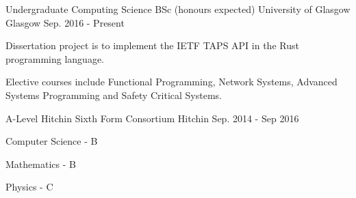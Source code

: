 

\begin{cventries}

  \cventry
    {Undergraduate Computing Science BSc (honours expected)} %
    {University of Glasgow} %
    {Glasgow} %
    {Sep. 2016 - Present} %
    {
      \begin{cvitems} %
        \item {Dissertation project is to implement the IETF TAPS API in the Rust programming language.}
	\item {Elective courses include Functional Programming, Network Systems, Advanced Systems Programming and Safety Critical Systems.}
      \end{cvitems}
    }
  \cventry
    {A-Level}
    {Hitchin Sixth Form Consortium}
    {Hitchin}
    {Sep. 2014 - Sep 2016}
    {
      \begin{cvitems}
        \item{Computer Science - B}
	\item{Mathematics - B}
	\item{Physics - C}
      \end{cvitems}
    }
\end{cventries}
